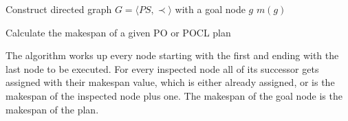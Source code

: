 \begin{algorithm}
  \SetAlgoLined
  Construct directed graph $G=\langle PS, \prec \rangle$ with a goal node $g$\;
  \Return $m(g)$\;
  \caption{Calculate the makespan of a given PO or POCL plan}

\end{algorithm}

The algorithm works up every node starting with the first and ending with the last node to be executed.
For every inspected node all of its successor gets assigned with their makespan value, which is either already assigned,
or is the makespan of the inspected node plus one. The makespan of the goal node is the makespan of the plan. 




